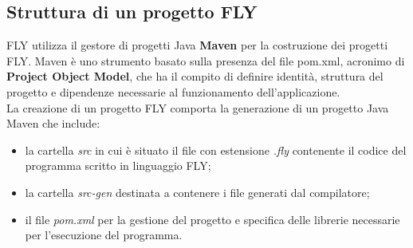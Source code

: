 \subsection{Struttura di un progetto FLY}
FLY utilizza il gestore di progetti Java \textbf{Maven} \cite{maven} per la costruzione dei progetti FLY. Maven è uno strumento basato sulla presenza del file pom.xml, acronimo di \textbf{Project Object Model}, che ha il compito di definire identità, struttura del progetto e dipendenze necessarie al funzionamento dell'applicazione. \\
La creazione di un progetto FLY comporta la generazione di un progetto Java Maven che include:
\begin{itemize}
    \item la cartella \textit{src} in cui è situato il file con estensione \textit{.fly} contenente il codice del programma scritto in linguaggio FLY;
    \item la cartella \textit{src-gen} destinata a contenere i file generati dal compilatore;
    \item il file \textit{pom.xml} per la gestione del progetto e specifica delle librerie necessarie per l'esecuzione del programma.
\end{itemize}
